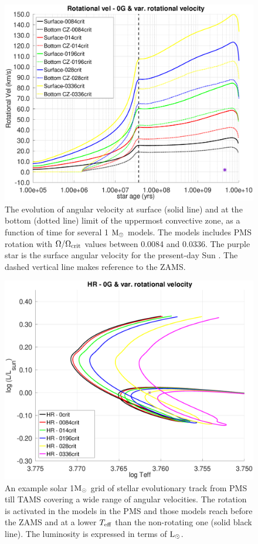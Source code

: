\documentclass[fleqn,usenatbib]{mnras}
\begin{document}
\begin{ceqn}
\begin{figure}
	\includegraphics[trim = 10mm 10mm 15mm 10mm clip,width=\columnwidth]{figures/paper1/rot_vel_var_vel_0_0g.eps}
    \caption{The evolution of angular velocity at surface (solid line) and at the bottom (dotted line) limit of the uppermost convective zone, as a function of time for several 1 $\mathrm{M}_\odot$ models. The models includes PMS rotation with $\Omega / \Omega_{\mathrm{crit}}$ values between 0.0084 and 0.0336. The purple star is the surface angular velocity for the present-day Sun \citep{Gill2012}. The dashed vertical line makes reference to the ZAMS.}
    \label{fig:rot_vel_0g}
\end{figure}


\begin{figure}
	\includegraphics[trim = 10mm 10mm 15mm 10mm, clip,width=\columnwidth]{figures/hr_var_vel_0_0g_z1.eps}
    \caption{An example solar 1$\mathrm{M}_\odot$ grid of stellar evolutionary track from PMS till TAMS covering a wide range of angular velocities. The rotation is activated in the models in the PMS and those models reach before the ZAMS and at a lower $T_{\mathrm{eff}}$ than the non-rotating one (solid black line). The luminosity is expressed in terms of $\mathrm{L}_\odot$.}
    \label{fig:hr_var_vel_0g}
\end{figure}


\end{ceqn}
\end{document}
